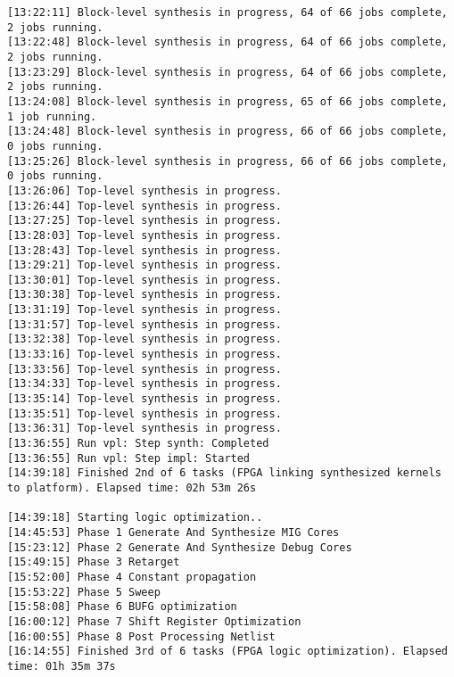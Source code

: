 \begin{lstlisting}[label=lst:lev_rec,caption=Содержимое log-файла]
[13:22:11] Block-level synthesis in progress, 64 of 66 jobs complete, 2 jobs running.
[13:22:48] Block-level synthesis in progress, 64 of 66 jobs complete, 2 jobs running.
[13:23:29] Block-level synthesis in progress, 64 of 66 jobs complete, 2 jobs running.
[13:24:08] Block-level synthesis in progress, 65 of 66 jobs complete, 1 job running.
[13:24:48] Block-level synthesis in progress, 66 of 66 jobs complete, 0 jobs running.
[13:25:26] Block-level synthesis in progress, 66 of 66 jobs complete, 0 jobs running.
[13:26:06] Top-level synthesis in progress.
[13:26:44] Top-level synthesis in progress.
[13:27:25] Top-level synthesis in progress.
[13:28:03] Top-level synthesis in progress.
[13:28:43] Top-level synthesis in progress.
[13:29:21] Top-level synthesis in progress.
[13:30:01] Top-level synthesis in progress.
[13:30:38] Top-level synthesis in progress.
[13:31:19] Top-level synthesis in progress.
[13:31:57] Top-level synthesis in progress.
[13:32:38] Top-level synthesis in progress.
[13:33:16] Top-level synthesis in progress.
[13:33:56] Top-level synthesis in progress.
[13:34:33] Top-level synthesis in progress.
[13:35:14] Top-level synthesis in progress.
[13:35:51] Top-level synthesis in progress.
[13:36:31] Top-level synthesis in progress.
[13:36:55] Run vpl: Step synth: Completed
[13:36:55] Run vpl: Step impl: Started
[14:39:18] Finished 2nd of 6 tasks (FPGA linking synthesized kernels to platform). Elapsed time: 02h 53m 26s 

[14:39:18] Starting logic optimization..
[14:45:53] Phase 1 Generate And Synthesize MIG Cores
[15:23:12] Phase 2 Generate And Synthesize Debug Cores
[15:49:15] Phase 3 Retarget
[15:52:00] Phase 4 Constant propagation
[15:53:22] Phase 5 Sweep
[15:58:08] Phase 6 BUFG optimization
[16:00:12] Phase 7 Shift Register Optimization
[16:00:55] Phase 8 Post Processing Netlist
[16:14:55] Finished 3rd of 6 tasks (FPGA logic optimization). Elapsed time: 01h 35m 37s 


\end{lstlisting}
